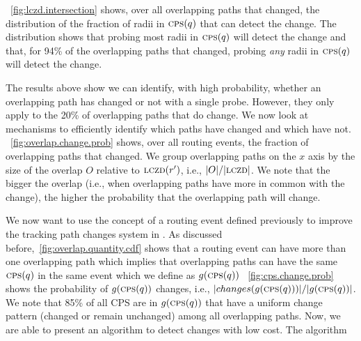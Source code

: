 


\figstr~\ref{fig:lczd.intersection} shows, over all overlapping
paths that changed, the distribution of the fraction of radii in
$\mathrm{\textsc{cps}}(q)$ that can detect the change.  The distribution shows that
probing most radii in $\mathrm{\textsc{cps}}(q)$ will detect the change and
that, for 94\% of the overlapping paths that changed, probing
\emph{any} radii in $\mathrm{\textsc{cps}}(q)$ will detect the change.

 The results above show we
can identify, with high probability, whether an overlapping path has
changed or not with a single probe.  However, they only apply to the
20\% of overlapping paths that do change.  We now look at mechanisms
to efficiently identify which paths have changed and which have not.
\figstr~\ref{fig:overlap.change.prob} shows, over all routing
events, the fraction of overlapping paths that changed.  We group
overlapping paths on the $x$ axis by the size of the overlap $O$
relative to $\mathrm{\textsc{lczd}}(r')$, i.e., $|O|/|\mathrm{\textsc{lczd}}|$.  We note that the
bigger the overlap (i.e., when overlapping paths have more in common
with the change), the higher the probability that the overlapping
path will change.  

 We
now want to use the concept of a routing event defined
previously to improve the tracking path changes system
in \dtrack. As discussed before,\figstr~\ref{fig:overlap.quantity.cdf}  
shows that a routing event can have more than one overlapping path
which implies that overlapping paths can have the same
$\mathrm{\textsc{cps}}(q)$ in the same event which we define as $g(\mathrm{\textsc{cps}}(q))$
\figstr~\ref{fig:cps.change.prob} shows the probability of 
$g(\mathrm{\textsc{cps}}(q))$ changes, i.e., $|changes(g(\mathrm{\textsc{cps}}(q)))|/|g(\mathrm{\textsc{cps}}(q))|$. 
We note that 85\% of all CPS are in $g(\mathrm{\textsc{cps}}(q))$ that have a uniform change
pattern (changed or remain unchanged) among all overlapping
paths. Now, we are able to present an algorithm to detect
changes with low cost. The algorithm

